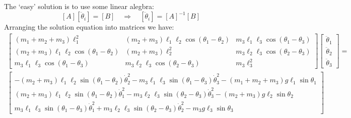 \documentclass[letterpaper,8pt]{article}
\begin{document}
The `easy' solution is to use some linear alegbra:
\[
\left[ A \right] \left[ \ddot{\theta}_i \right] = \left[ B \right]
\quad \Rightarrow \quad
 \left[ \ddot{\theta}_i \right] = \left[ A \right]^{-1} \left[ B \right]
\]
Arranging the solution equation into matrices we have:
\begin{multline*}
\left[ \begin{array}{ccc}
       (m_1 + m_2 + m_3)\ell_1^2 & (m_2 + m_3)\ell_1\ell_2 \cos(\theta_1 - \theta_2) & m_3 \ell_1 \ell_3 \cos (\theta_1 - \theta_3) \\
       (m_2 + m_3) \ell_1 \ell_2 \cos (\theta_1 - \theta_2) & (m_2 + m_3) \ell_2^2 & m_3 \ell_2 \ell_3 \cos (\theta_2 - \theta_3) \\
       m_3 \ell_1 \ell_3 \cos (\theta_1 - \theta_3) & m_3 \ell_2 \ell_3 \cos (\theta_2 - \theta_3) & m_3 \ell_3^2 
\end{array}\right]
\left[ \begin{array}{ccc}
       \ddot{\theta}_1 \\ \ddot{\theta}_2 \\ \ddot{\theta}_3 
\end{array}\right]
=
\\
\left[ \begin{array}{ccc}
    -(m_2 + m_3)\ell_1\ell_2 \sin(\theta_1 - \theta_2)\dot{\theta}_2^2 - m_3 \ell_1 \ell_3 \sin (\theta_1 - \theta_3)\dot{\theta}_3^2 - (m_1 + m_2 + m_3) g \ell_1 \sin \theta_1 \\
    (m_2 + m_3) \ell_1 \ell_2 \sin (\theta_1 - \theta_2) \dot{\theta}_1^2 - m_3 \ell_2 \ell_3 \sin (\theta_2 - \theta_3) \dot{\theta}_3^2 - (m_2 + m_3) g \ell_2 \sin \theta_2  \\
    m_3 \ell_1 \ell_3 \sin (\theta_1 - \theta_3) \dot{\theta}_1^2 + m_3 \ell_2 \ell_3 \sin (\theta_2 - \theta_3) \dot{\theta}_2^2 - m_3 g \ell_3 \sin \theta_3 
\end{array}\right]
\end{multline*}
\end{document}
